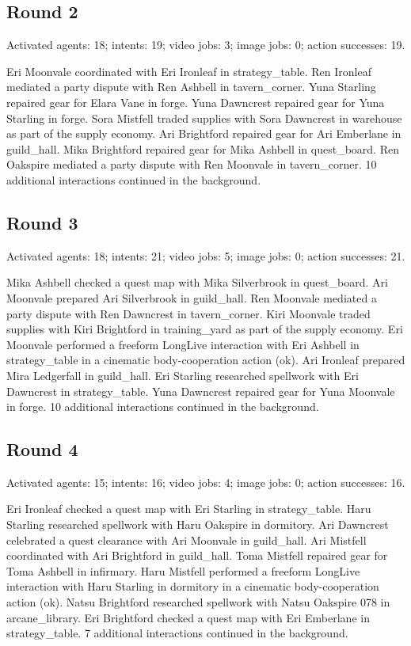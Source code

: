 \documentclass[11pt,a4paper]{article}
\begin{document}
\subsection{Round 2}
Activated agents: 18; intents: 19; video jobs: 3; image jobs: 0; action successes: 19.

Eri Moonvale coordinated with Eri Ironleaf in strategy\_table. Ren Ironleaf mediated a party dispute with Ren Ashbell in tavern\_corner. Yuna Starling repaired gear for Elara Vane in forge. Yuna Dawncrest repaired gear for Yuna Starling in forge. Sora Mistfell traded supplies with Sora Dawncrest in warehouse as part of the supply economy. Ari Brightford repaired gear for Ari Emberlane in guild\_hall. Mika Brightford repaired gear for Mika Ashbell in quest\_board. Ren Oakspire mediated a party dispute with Ren Moonvale in tavern\_corner. 10 additional interactions continued in the background.

\subsection{Round 3}
Activated agents: 18; intents: 21; video jobs: 5; image jobs: 0; action successes: 21.

Mika Ashbell checked a quest map with Mika Silverbrook in quest\_board. Ari Moonvale prepared Ari Silverbrook in guild\_hall. Ren Moonvale mediated a party dispute with Ren Dawncrest in tavern\_corner. Kiri Moonvale traded supplies with Kiri Brightford in training\_yard as part of the supply economy. Eri Moonvale performed a freeform LongLive interaction with Eri Ashbell in strategy\_table in a cinematic body-cooperation action (ok). Ari Ironleaf prepared Mira Ledgerfall in guild\_hall. Eri Starling researched spellwork with Eri Dawncrest in strategy\_table. Yuna Dawncrest repaired gear for Yuna Moonvale in forge. 10 additional interactions continued in the background.

\subsection{Round 4}
Activated agents: 15; intents: 16; video jobs: 4; image jobs: 0; action successes: 16.

Eri Ironleaf checked a quest map with Eri Starling in strategy\_table. Haru Starling researched spellwork with Haru Oakspire in dormitory. Ari Dawncrest celebrated a quest clearance with Ari Moonvale in guild\_hall. Ari Mistfell coordinated with Ari Brightford in guild\_hall. Toma Mistfell repaired gear for Toma Ashbell in infirmary. Haru Mistfell performed a freeform LongLive interaction with Haru Starling in dormitory in a cinematic body-cooperation action (ok). Natsu Brightford researched spellwork with Natsu Oakspire 078 in arcane\_library. Eri Brightford checked a quest map with Eri Emberlane in strategy\_table. 7 additional interactions continued in the background.
\end{document}
